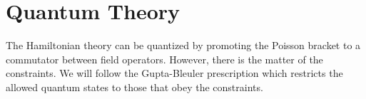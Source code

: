 \section{Quantum Theory}
\label{sec:EM_quantization}
The Hamiltonian theory can be quantized by promoting the Poisson bracket to a commutator
between field operators.  However, there is the matter of the constraints.  We will follow the Gupta-Bleuler
prescription which restricts the allowed quantum states to those that obey the constraints.  
